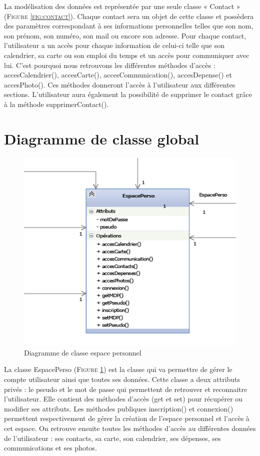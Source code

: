 \documentclass[11pt]{article}
\begin{document}
La modélisation des données est représentée par une seule classe « Contact »  (\textsc{Figure \ref{fig:contact}}). Chaque contact sera un objet de cette classe et possèdera des paramètres correspondant à ses informations personnelles telles que son nom, son prénom, son numéro, son mail ou encore son adresse. Pour chaque contact, l’utilisateur a un accès pour chaque information de celui-ci telle que son calendrier, sa carte ou son emploi du temps et un accès pour communiquer avec lui. C’est pourquoi nous retrouvons les différentes méthodes d’accès : accesCalendrier(), accesCarte(), accesCommunication(), accesDepense() et accesPhoto(). Ces méthodes donneront l’accès à l’utilisateur aux différentes sections. L’utilisateur aura également la possibilité de supprimer le contact grâce à la méthode supprimerContact().


\newpage
\section{Diagramme de classe global}
\begin{figure}[!h]
        \centering \includegraphics[scale=2]{espace.png}
        \caption{Diagramme de classe espace personnel}
         \label{fig:espace}
\end{figure}

La classe EspacePerso (\textsc{Figure \ref{fig:espace}}) est la classe qui va permettre de gérer le compte utilisateur ainsi que toutes ses données. Cette classe a deux attributs privés : le pseudo et le mot de passe qui permettent de retrouver et reconnaitre l'utilisateur. Elle contient des méthodes d'accès (get et set) pour récupérer ou modifier ses attributs. Les méthodes publiques inscription() et connexion() permettent respectivement de gérer la création de l'espace personnel et l'accès à cet espace. On retrouve ensuite toutes les méthodes d'accès au différentes données de l'utilisateur : ses contacts, sa carte, son calendrier, ses dépenses, ses communications et ses photos. 
\end{document}
